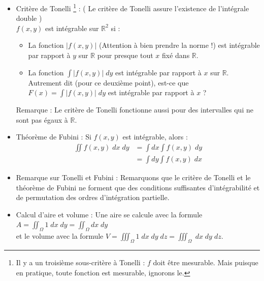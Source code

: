 \documentclass[a4paper]{article}
\begin{document}
\begin{itemize}
\item Critère de Tonelli \footnote{Il y a un troisième sous-critère à Tonelli : $ f $ doit être mesurable. Mais puisque en pratique, toute fonction est mesurable, ignorons le.} : \Big( Le critère de Tonelli assure l'existence de l'intégrale double \Big) \\
$ f(x, y) $ est intégrable sur $ \mathbb{R}^2 $ si : 
\begin{itemize}
    \item La fonction $ | f(x, y) | $ (Attention à bien prendre la norme !) est intégrable par rapport à $ y $ sur $ \mathbb{R} $ pour 
presque tout $ x $ fixé dans $ \mathbb{R} $. \\
    \item La fonction $\displaystyle \int | f(x, y) | \; d y $ est intégrable par rapport à $ x $ sur $ \mathbb{R} $. \\
Autrement dit (pour ce deuxième point), est-ce que $\displaystyle F(x) = \int | f(x, y) | \; d y $ est intégrable par rapport à $ x $ ?
\end{itemize}

Remarque : Le critère de Tonelli fonctionne aussi pour des intervalles qui ne sont pas égaux à $ \mathbb{R} $.






\item Théorème de Fubini : Si $ f(x, y) $ est intégrable, alors : 
\begin{align*}
\iint f(x, y) \; d x \; d y &= \int d x \int f(x, y) \; d y \\
 &= \int d y \int f(x, y) \; d x
\end{align*}






\item Remarque sur Tonelli et Fubini : Remarquons que le critère de Tonelli et le théorème de Fubini ne forment que des conditions suffisantes d'intégrabilité et de permutation des ordres d'intégration partielle.






\item Calcul d'aire et volume : Une aire se calcule avec la formule $\displaystyle A = \iint_\Omega 1 \; d x \; d y = \iint_\Omega d x \; d y $ \\ et le volume avec la formule $\displaystyle V = \iiint_\Omega 1 \; d x \; d y \; d z = \iiint_\Omega \; d x \; d y \; d z $.







\end{itemize}
\end{document}
